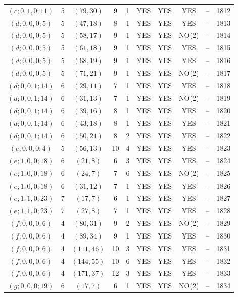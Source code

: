 \begin{longtable}{|c|c|c|c|c|c|c|c|c|c|}
$(c; 0, 1, 0; 11)$ & 5 & $(79, 30)$ & 9 & 1 & YES & YES & YES & -- & 1812\\
$(d; 0, 0, 0; 5)$ & 5 & $(47, 18)$ & 8 & 1 & YES & YES & YES & -- & 1813\\
$(d; 0, 0, 0; 5)$ & 5 & $(58, 17)$ & 9 & 1 & YES & YES & NO(2) & -- & 1814\\
$(d; 0, 0, 0; 5)$ & 5 & $(61, 18)$ & 9 & 1 & YES & YES & YES & -- & 1815\\
$(d; 0, 0, 0; 5)$ & 5 & $(68, 19)$ & 9 & 1 & YES & YES & YES & -- & 1816\\
$(d; 0, 0, 0; 5)$ & 5 & $(71, 21)$ & 9 & 1 & YES & YES & NO(2) & -- & 1817\\
$(d; 0, 0, 1; 14)$ & 6 & $(29, 11)$ & 7 & 1 & YES & YES & YES & -- & 1818\\
$(d; 0, 0, 1; 14)$ & 6 & $(31, 13)$ & 7 & 1 & YES & YES & NO(2) & -- & 1819\\
$(d; 0, 0, 1; 14)$ & 6 & $(39, 16)$ & 8 & 1 & YES & YES & YES & -- & 1820\\
$(d; 0, 0, 1; 14)$ & 6 & $(43, 18)$ & 8 & 1 & YES & YES & YES & -- & 1821\\
$(d; 0, 0, 1; 14)$ & 6 & $(50, 21)$ & 8 & 2 & YES & YES & YES & -- & 1822\\
$(e; 0, 0, 0; 4)$ & 5 & $(56, 13)$ & 10 & 4 & YES & YES & YES & -- & 1823\\
$(e; 1, 0, 0; 18)$ & 6 & $(21, 8)$ & 6 & 3 & YES & YES & YES & -- & 1824\\
$(e; 1, 0, 0; 18)$ & 6 & $(24, 7)$ & 7 & 6 & YES & YES & NO(2) & -- & 1825\\
$(e; 1, 0, 0; 18)$ & 6 & $(31, 12)$ & 7 & 1 & YES & YES & YES & -- & 1826\\
$(e; 1, 1, 0; 23)$ & 7 & $(17, 7)$ & 6 & 1 & YES & YES & YES & -- & 1827\\
$(e; 1, 1, 0; 23)$ & 7 & $(27, 8)$ & 7 & 1 & YES & YES & YES & -- & 1828\\
$(f; 0, 0, 0; 6)$ & 4 & $(80, 31)$ & 9 & 2 & YES & YES & NO(2) & -- & 1829\\
$(f; 0, 0, 0; 6)$ & 4 & $(89, 34)$ & 9 & 1 & YES & YES & YES & -- & 1830\\
$(f; 0, 0, 0; 6)$ & 4 & $(111, 46)$ & 10 & 3 & YES & YES & YES & -- & 1831\\
$(f; 0, 0, 0; 6)$ & 4 & $(144, 55)$ & 10 & 6 & YES & YES & YES & -- & 1832\\
$(f; 0, 0, 0; 6)$ & 4 & $(171, 37)$ & 12 & 3 & YES & YES & YES & -- & 1833\\
$(g; 0, 0, 0; 19)$ & 6 & $(17, 7)$ & 6 & 1 & YES & YES & NO(2) & -- & 1834\\

\end{longtable}

